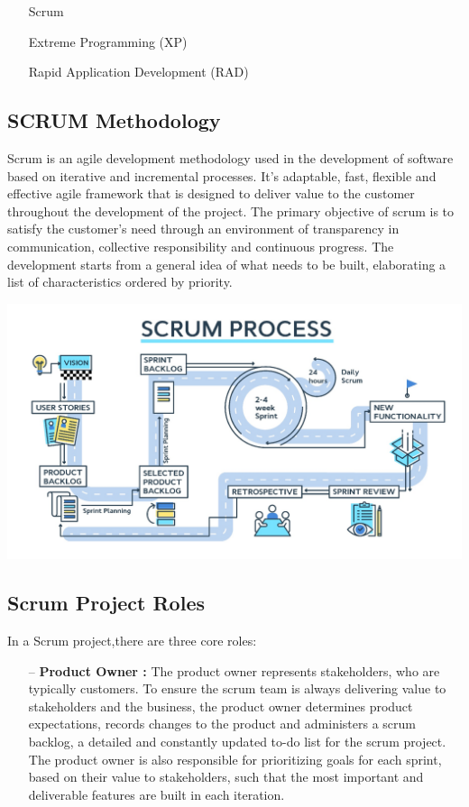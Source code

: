 \documentclass{report}
\begin{document}
 \begin{itemize}
\item [\ding{51}]  Scrum
\item  [\ding{51}]Extreme Programming (XP) 
\item [\ding{51}]Rapid Application Development (RAD)

\end{itemize}

\subsection {SCRUM Methodology}
\textnormal{
Scrum is an agile development methodology used in the development of software based on iterative and incremental processes. It's adaptable, fast, flexible and effective agile framework that is designed to deliver value to the customer throughout the development of the project. The primary objective of scrum is to satisfy the customer's need through an environment of transparency in communication, collective responsibility and continuous progress. The development starts from a general idea of what needs to be built, elaborating a list of characteristics ordered by priority.
}

\begin{center}
 \includegraphics[scale=0.2]{images/Scrum.jpg}
\end{center}

\subsection {Scrum Project Roles}

\textnormal{
In a Scrum project,there are three core roles:
}
\begin{itemize}
    \item[--]\textbf{\normalsize Product Owner :} \textnormal{The product owner represents stakeholders, who are typically customers. To ensure the scrum team is always delivering value to stakeholders and the business, the product owner determines product expectations, records changes to the product and administers a scrum backlog, a detailed and constantly updated to-do list for the scrum project. The product owner is also responsible for prioritizing goals for each sprint, based on their value to stakeholders, such that the most important and deliverable features are built in each iteration.}
\end{itemize}
\end{document}
